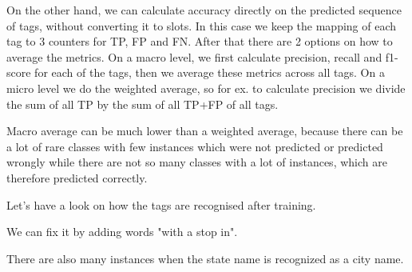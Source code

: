 \documentclass[12pt,titlepage,a4paper]{article}
\begin{document}
On the other hand, we can calculate accuracy directly on the predicted sequence of tags, without converting it to slots. In this case we keep the mapping of each tag to 3 counters for TP, FP and FN. After that there are 2 options on how to average the metrics. On a macro level, we first calculate precision, recall and f1-score for each of the tags, then we average these metrics across all tags. On a micro level we do the weighted average, so for ex. to calculate precision we divide the sum of all TP by the sum of all TP+FP of all tags. 

Macro average can be much lower than a weighted average, because there can be a lot of rare classes with few instances which were not predicted or predicted wrongly while there are not so many classes with a lot of instances, which are therefore predicted correctly.

Let's have a look on how the tags are recognised after training. 
\begin{center}
\end{center}

We can fix it by adding words "with a stop in".
\begin{center}
\end{center}

There are also many instances when the state name is recognized as a city name. 
\begin{center}
\end{center}
\end{document}
